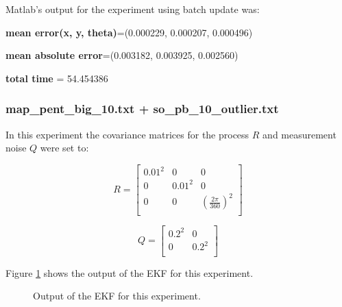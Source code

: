 Matlab's output for the experiment using batch update was:

\textbf{mean error(x, y, theta)}=(0.000229, 0.000207, 0.000496)

\textbf{mean absolute error}=(0.003182, 0.003925, 0.002560)

\textbf{total time} = 54.454386



\subsubsection{map\_pent\_big\_10.txt + so\_pb\_10\_outlier.txt}

In this experiment the covariance matrices for the process $R$ and measurement noise $Q$ were set to:

\[
R =
\begin{bmatrix}
    0.01^2  & 0			& 0 \\
    0       & 0.01^2 	& 0 \\
    0       & 0 		& (\frac{2\pi}{360})^2 \\

\end{bmatrix}
\]


\[
Q =
\begin{bmatrix}
    0.2^2  & 0 \\
    0      & 0.2^2 \\

\end{bmatrix}
\]


Figure \ref{fig:iii3_2} shows the output of the EKF for this experiment.

\begin{figure}[H]
	\scalebox{0.6}{}
	\scalebox{0.6}{}
	
	\centering
	\centerline{}
	\caption{Output of the EKF for this experiment.}

	\label{fig:iii3_2}
\end{figure}

